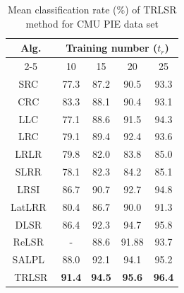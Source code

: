 \begin{table}
\caption{Mean classification rate ($\%$) of TRLSR method for CMU PIE data set}
\label{table: TRLSR_Accuracy_CMU_train}
\centering
\begin{tabular}{|c|cccc|}
\hline
\multirow{2}{*}{Alg.} & \multicolumn{4}{c|}{Training number ($t_r$)}                                                                                 \\ \cline{2-5} 
                      & \multicolumn{1}{c|}{10}            & \multicolumn{1}{c|}{15}            & \multicolumn{1}{c|}{20}            & 25            \\ \hline
SRC~\cite{SRC}                   & \multicolumn{1}{c|}{77.3}          & \multicolumn{1}{c|}{87.2}          & \multicolumn{1}{c|}{90.5}          & 93.3          \\ \hline
CRC~\cite{CRC}                   & \multicolumn{1}{c|}{83.3}          & \multicolumn{1}{c|}{88.1}          & \multicolumn{1}{c|}{90.4}          & 93.1          \\ \hline
LLC~\cite{LLC}                   & \multicolumn{1}{c|}{77.1}          & \multicolumn{1}{c|}{88.6}          & \multicolumn{1}{c|}{91.5}          & 94.3          \\ \hline
LRC~\cite{LRC}                   & \multicolumn{1}{c|}{79.1}          & \multicolumn{1}{c|}{89.4}          & \multicolumn{1}{c|}{92.4}          & 93.6          \\ \hline
LRLR~\cite{LRLR_SLRR}                  & \multicolumn{1}{c|}{79.8}          & \multicolumn{1}{c|}{82.0}          & \multicolumn{1}{c|}{83.8}          & 85.0          \\ \hline
SLRR~\cite{LRLR_SLRR}                  & \multicolumn{1}{c|}{78.1}          & \multicolumn{1}{c|}{82.3}          & \multicolumn{1}{c|}{84.2}          & 85.1          \\ \hline
LRSI~\cite{LRSI}                  & \multicolumn{1}{c|}{86.7}          & \multicolumn{1}{c|}{90.7}          & \multicolumn{1}{c|}{92.7}          & 94.8          \\ \hline
LatLRR~\cite{LatLRR}                & \multicolumn{1}{c|}{80.4}          & \multicolumn{1}{c|}{86.7}          & \multicolumn{1}{c|}{90.0}          & 91.3          \\ \hline
DLSR~\cite{DLSR}                  & \multicolumn{1}{c|}{86.4}          & \multicolumn{1}{c|}{92.3}          & \multicolumn{1}{c|}{94.7}          & 95.8          \\ \hline
ReLSR~\cite{ReLSR}                 & \multicolumn{1}{c|}{-}             & \multicolumn{1}{c|}{88.6}          & \multicolumn{1}{c|}{91.88}         & 93.7          \\ \hline
SALPL~\cite{SALPL}                 & \multicolumn{1}{c|}{88.0}          & \multicolumn{1}{c|}{92.1}          & \multicolumn{1}{c|}{94.1}          & 95.2          \\ \hline
TRLSR                 & \multicolumn{1}{c|}{\textbf{91.4}} & \multicolumn{1}{c|}{\textbf{94.5}} & \multicolumn{1}{c|}{\textbf{95.6}} & \textbf{96.4} \\ \hline
\end{tabular}
\end{table}
